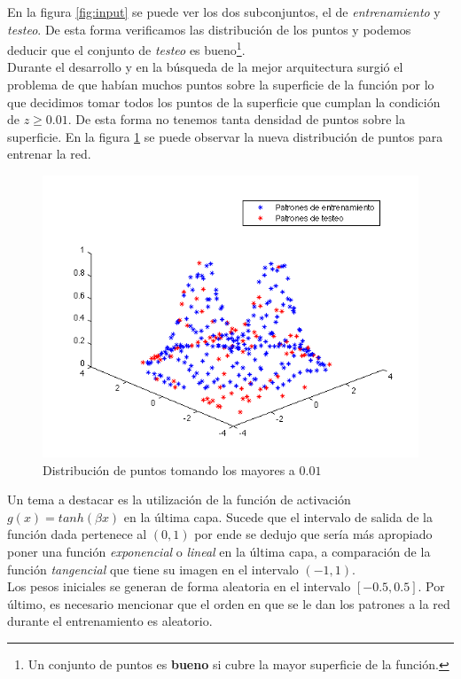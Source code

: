 \documentclass{sig-alternate}
\begin{document}
	En la figura \ref{fig:input} se puede ver los dos subconjuntos, el de \textit{entrenamiento} y \textit{testeo}. De esta forma verificamos las distribución de los puntos y podemos deducir que el conjunto de \textit{testeo} es bueno\footnote{Un conjunto de puntos es \textbf{bueno} si cubre la mayor superficie de la función.}.\\
	Durante el desarrollo y en la búsqueda de la mejor arquitectura surgió el problema de que habían muchos puntos sobre la superficie de la función por lo que decidimos tomar todos los puntos de la superficie que cumplan la condición de $z \geq 0.01$. De esta forma no tenemos tanta densidad de puntos sobre la superficie. En la figura \ref{fig:input2} se puede observar la nueva distribución de puntos para entrenar la red.

	\begin{figure}[!ht]
		\includegraphics[scale=0.5]{./figures/muestreo2.png}
		\caption{Distribución de puntos tomando los mayores a $0.01$}
		\label{fig:input2}
	\end{figure}

	Un tema a destacar es la utilización de la función de activación $g(x) = tanh(\beta x)$ en la última capa. Sucede que el intervalo de salida de la función dada pertenece al $(0,1)$ por ende se dedujo que sería más apropiado poner una función \textit{exponencial} o \textit{lineal} en la última capa, a comparación de la función \textit{tangencial} que tiene su imagen en el intervalo $(-1,1)$. \\

	Los pesos iniciales se generan de forma aleatoria en el intervalo $[-0.5,0.5]$. Por último, es necesario mencionar que el orden en que se le dan los patrones a la red durante el entrenamiento es aleatorio.
	
\end{document}
